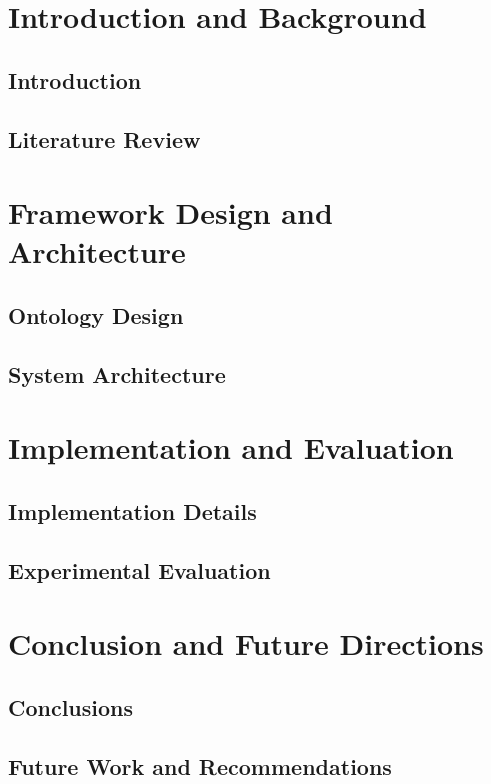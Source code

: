 \mainmatter

\part{Introduction and Background}
\label{part:introduction-background}

\chapter{Introduction}
\label{ch:introduction}


\chapter{Literature Review}
\label{ch:literature-review}


\part{Framework Design and Architecture}
\label{part:framework-design-architecture}

\chapter{Ontology Design}
\label{ch:ontology-design}


\chapter{System Architecture}
\label{ch:system-architecture}


\part{Implementation and Evaluation}
\label{part:implementation-evaluation}

\chapter{Implementation Details}
\label{ch:implementation}


\chapter{Experimental Evaluation}
\label{ch:evaluation}


\part{Conclusion and Future Directions}
\label{part:conclusion-future-directions}

\chapter{Conclusions}
\label{ch:conclusions}


\chapter{Future Work and Recommendations}
\label{ch:future-work}

